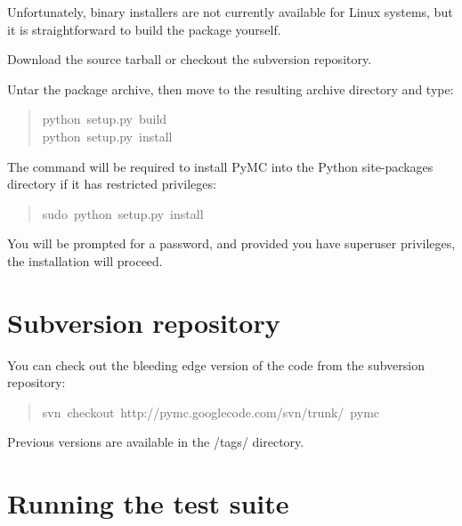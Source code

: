 Unfortunately, binary installers are not currently available for Linux systems,
but it is straightforward to build the package yourself.
\setcounter{listcnt0}{0}
\begin{list}{.}
{
\setlength{\rightmargin}{\leftmargin}
}
\item {} 
Download the source tarball or checkout the subversion repository.

\item {} 
Untar the package archive, then move to the resulting archive directory and type:
\begin{quote}{\ttfamily \raggedright \noindent
python~setup.py~build~\\
python~setup.py~install
}\end{quote}

\end{list}

The  command will be required to install PyMC into the Python site-packages
directory if it has restricted privileges:
\begin{quote}{\ttfamily \raggedright \noindent
sudo~python~setup.py~install
}\end{quote}

You will be prompted for a  password, and provided you have superuser privileges,
the installation will proceed.



\hypertarget{subversion-repository}{}
\section*{Subversion repository}
\label{subversion-repository}

You can check out the bleeding edge version of the code from the subversion
repository:
\begin{quote}{\ttfamily \raggedright \noindent
svn~checkout~http://pymc.googlecode.com/svn/trunk/~pymc
}\end{quote}

Previous versions are available in the /tags/ directory.



\hypertarget{running-the-test-suite}{}
\section*{Running the test suite}
\label{running-the-test-suite}

